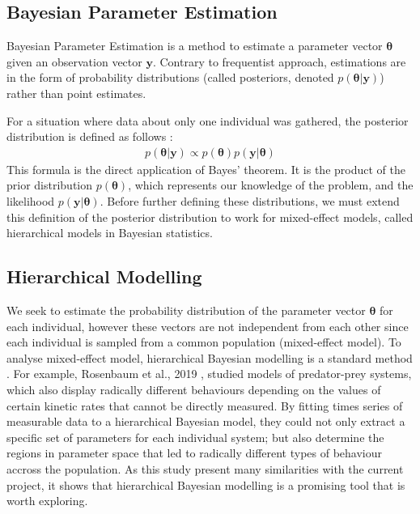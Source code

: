 \documentclass[11pt]{article}
\begin{document}
\subsection{Bayesian Parameter Estimation}

Bayesian Parameter Estimation is a method to estimate a parameter vector $\boldsymbol{\theta}$ given an observation vector $\boldsymbol{y}$. Contrary to frequentist approach, estimations are in the form of probability distributions (called posteriors, denoted $p(\boldsymbol{\theta}|\boldsymbol{y})$) rather than point estimates. 

For a situation where data about only one individual was gathered, the posterior distribution is defined as follows \cite{tbk_gelman}:
\begin{align*}
    p(\boldsymbol{\theta} | \boldsymbol{y}) \propto p(\boldsymbol{\theta})p(\boldsymbol{y}|\boldsymbol{\theta})
\end{align*} 
This formula is the direct application of Bayes' theorem. It is the product of the prior distribution $p(\boldsymbol{\theta})$, which represents our knowledge of the problem, and the likelihood $p(\boldsymbol{y} | \boldsymbol{\theta})$. Before further defining these distributions, we must extend this definition of the posterior distribution to work for mixed-effect models, called hierarchical models in Bayesian statistics. 

\subsection{Hierarchical Modelling}
We seek to estimate the probability distribution of the parameter vector $\boldsymbol{\theta}$ for each individual, however these vectors are not independent from each other since each individual is sampled from a common population (mixed-effect model). To analyse mixed-effect model, hierarchical Bayesian modelling is a standard method \cite{revParamEst}\cite{rosenbaum}. For example, Rosenbaum et al., 2019 \cite{rosenbaum}, studied models of predator-prey systems, which also display radically different behaviours depending on the values of certain kinetic rates that cannot be directly measured. By fitting times series of measurable data to a hierarchical Bayesian model, they could not only extract a specific set of parameters for each individual system; but also determine the regions in parameter space that led to radically different types of behaviour accross the population. As this study present many similarities with the current project, it shows that hierarchical Bayesian modelling is a promising tool that is worth exploring.
\end{document}
